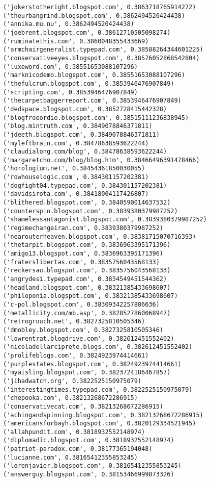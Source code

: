 \documentclass[11pt]{article}
\begin{document}
\begin{Verbatim}[commandchars=\\\{\}]
('jokerstotheright.blogspot.com', 0.3863718765914272)
('theurbangrind.blogspot.com', 0.3862494520424438)
('annika.mu.nu', 0.3862494520424438)
('joebrent.blogspot.com', 0.38612710505098274)
('ruminatethis.com', 0.3860048355433669)
('armchairgeneralist.typepad.com', 0.38588264344601225)
('conservativeeyes.blogspot.com', 0.38576052868542804)
('luxeword.com', 0.38551653088107296)
('marknicodemo.blogspot.com', 0.38551653088107296)
('thefulcrum.blogspot.com', 0.3853946476907849)
('scripting.com', 0.3853946476907849)
('thecarpetbaggerreport.com', 0.3853946476907849)
('dedspace.blogspot.com', 0.3852728415442328)
('blogfreeordie.blogspot.com', 0.38515111236838945)
('blog.mintruth.com', 0.3849078846371811)
('jdeeth.blogspot.com', 0.3849078846371811)
('myleftbrain.com', 0.38478638593622244)
('claudialong.com/blog', 0.38478638593622244)
('margaretcho.com/blog/blog.htm', 0.38466496391478466)
('horologium.net', 0.38454361850030055)
('rowhouselogic.com', 0.384301157202381)
('dogfight04.typepad.com', 0.384301157202381)
('davidsirota.com', 0.38418004117426807)
('blithered.blogspot.com', 0.3840590014637532)
('counterspin.blogspot.com', 0.3839380379987252)
('shamelessantagonist.blogspot.com', 0.3839380379987252)
('regimechangeiran.com', 0.3839380379987252)
('nearouterheaven.blogspot.com', 0.38381715070716393)
('thetarpit.blogspot.com', 0.3836963395171396)
('amigo13.blogspot.com', 0.3836963395171396)
('fraterslibertas.com', 0.3835756043568133)
('reckersau.blogspot.com', 0.3835756043568133)
('angrydesi.typepad.com', 0.3834549451544362)
('headland.blogspot.com', 0.38321385433698607)
('philoponia.blogspot.com', 0.38321385433698607)
('c-pol.blogspot.com', 0.38309342257886636)
('metallicity.com/mb.asp', 0.3828527860068947)
('retrogrouch.net', 0.3827325810505346)
('dmobley.blogspot.com', 0.3827325810505346)
('lowrentrat.blogdrive.com', 0.382612451552402)
('nicoladellarciprete.blogs.com', 0.382612451552402)
('prolifeblogs.com', 0.3824923974414661)
('purplestates.blogspot.com', 0.3824923974414661)
('myaisling.blogspot.com', 0.3823724186467857)
('jihadwatch.org', 0.3822525150975079)
('interestingtimes.typepad.com', 0.3822525150975079)
('chepooka.com', 0.38213268672286915)
('conservativecat.com', 0.38213268672286915)
('achingandspinning.blogspot.com', 0.38213268672286915)
('americansforbayh.blogspot.com', 0.3820129334521945)
('allahpundit.com', 0.3818932552148974)
('diplomadic.blogspot.com', 0.3818932552148974)
('patriot-paradox.com', 0.38177365194048)
('lucianne.com', 0.38165412355853245)
('lorenjavier.blogspot.com', 0.38165412355853245)
('answerguy.blogspot.com', 0.38153466999873326)

\end{Verbatim}
\end{document}
